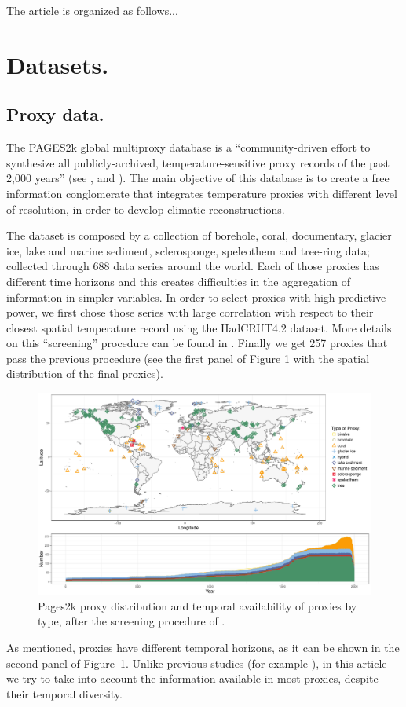 \documentclass[11pt]{amsart}
\theoremstyle{plain}
\theoremstyle{definition}
\theoremstyle{remark}
\begin{document}
The article is organized as follows...

\section{Datasets.}
\label{sec:data}

\subsection{Proxy data.}
The PAGES2k global multiproxy database is a ``community-driven effort to
synthesize all publicly-archived, temperature-sensitive proxy records of the
past 2,000 years'' (see \cite{Kaufman2014}, \cite{PAGES2KConsortium2013} and \cite{PAGES2kConsortium2017}). The main objective of this database is
to create a free information conglomerate that integrates temperature proxies
with different level of resolution, in order to develop climatic
reconstructions.

The dataset is composed by a collection of borehole, coral, documentary, glacier
ice, lake and marine 
sediment, sclerosponge, speleothem and tree-ring data; collected through 688
data series around the world. Each of those proxies
has different time horizons and this creates difficulties in the aggregation of
information in simpler variables.  In order to select proxies with high
predictive power, we first chose those series with large correlation with respect to
their closest spatial temperature record using the HadCRUT4.2 dataset. More
details on this ``screening'' procedure can be found in \cite{Emile-Geay2015}. Finally we get 257 proxies
that pass the previous procedure (see the first panel of Figure \ref{fig:proxy} with the spatial
distribution of the final proxies).   
\begin{figure}
  \centering
  \includegraphics[scale=0.45]{CombinedMap_Area}
  \caption{Pages2k proxy distribution and temporal availability of proxies by
    type, after the screening procedure of \cite{Emile-Geay2015}.}
  \label{fig:proxy}
\end{figure}
As mentioned, proxies have different temporal horizons, as it can be shown in the
second panel of Figure~\ref{fig:proxy}. Unlike previous studies (for example \cite{Barboza2014}), in this article we try to take into account the information available in most proxies, despite their temporal diversity.
\end{document}
